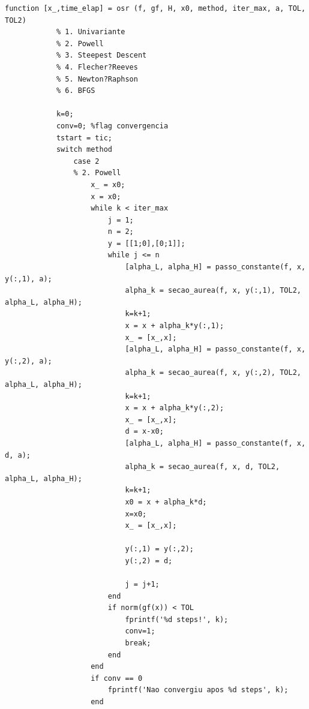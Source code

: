 \documentclass[10pt, a4paper]{article}
\begin{document}
\begin{minipage}{\linewidth}
      \begin{lstlisting}[style=myStyle, caption=script osr.m implementando o m\'etodo de Powell, label=list_osr]
            function [x_,time_elap] = osr (f, gf, H, x0, method, iter_max, a, TOL, TOL2)
            % 1. Univariante
            % 2. Powell
            % 3. Steepest Descent
            % 4. Flecher?Reeves
            % 5. Newton?Raphson
            % 6. BFGS

            k=0;
            conv=0; %flag convergencia
            tstart = tic;
            switch method
                case 2
                % 2. Powell
                    x_ = x0;
                    x = x0;
                    while k < iter_max
                        j = 1;
                        n = 2;
                        y = [[1;0],[0;1]];
                        while j <= n
                            [alpha_L, alpha_H] = passo_constante(f, x, y(:,1), a);
                            alpha_k = secao_aurea(f, x, y(:,1), TOL2, alpha_L, alpha_H);
                            k=k+1;
                            x = x + alpha_k*y(:,1);
                            x_ = [x_,x];
                            [alpha_L, alpha_H] = passo_constante(f, x, y(:,2), a);
                            alpha_k = secao_aurea(f, x, y(:,2), TOL2, alpha_L, alpha_H);
                            k=k+1;
                            x = x + alpha_k*y(:,2);
                            x_ = [x_,x];
                            d = x-x0;
                            [alpha_L, alpha_H] = passo_constante(f, x, d, a);
                            alpha_k = secao_aurea(f, x, d, TOL2, alpha_L, alpha_H);
                            k=k+1;
                            x0 = x + alpha_k*d;
                            x=x0;
                            x_ = [x_,x];

                            y(:,1) = y(:,2);
                            y(:,2) = d;

                            j = j+1;
                        end
                        if norm(gf(x)) < TOL
                            fprintf('%d steps!', k);
                            conv=1;
                            break;
                        end
                    end
                    if conv == 0
                        fprintf('Nao convergiu apos %d steps', k);
                    end
      \end{lstlisting}
\end{minipage}
\end{document}
